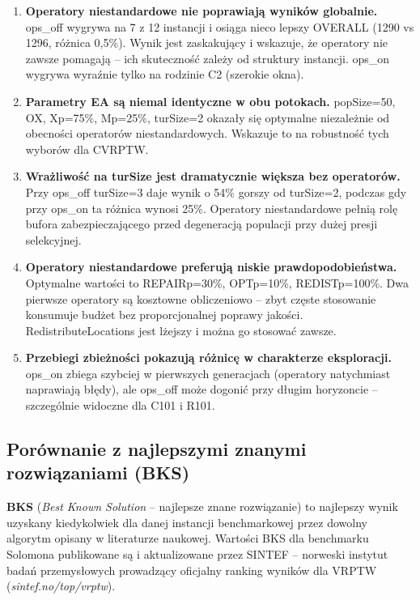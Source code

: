 \documentclass[11pt,a4paper]{article}
\begin{document}
\begin{enumerate}
    \item \textbf{Operatory niestandardowe nie poprawiają wyników globalnie.}
          ops\_off wygrywa na 7 z 12 instancji i osiąga nieco lepszy OVERALL
          (1290 vs 1296, różnica 0{,}5\%). Wynik jest zaskakujący i wskazuje,
          że operatory nie zawsze pomagają -- ich skuteczność zależy od struktury
          instancji. ops\_on wygrywa wyraźnie tylko na rodzinie C2 (szerokie okna).
    \item \textbf{Parametry EA są niemal identyczne w obu potokach.}
          popSize=50, OX, Xp=75\%, Mp=25\%, turSize=2 okazały się optymalne
          niezależnie od obecności operatorów niestandardowych.
          Wskazuje to na robustność tych wyborów dla CVRPTW.
    \item \textbf{Wrażliwość na turSize jest dramatycznie większa bez operatorów.}
          Przy ops\_off turSize=3 daje wynik o 54\% gorszy od turSize=2,
          podczas gdy przy ops\_on ta różnica wynosi 25\%.
          Operatory niestandardowe pełnią rolę bufora zabezpieczającego
          przed degeneracją populacji przy dużej presji selekcyjnej.
    \item \textbf{Operatory niestandardowe preferują niskie prawdopodobieństwa.}
          Optymalne wartości to REPAIRp=30\%, OPTp=10\%, REDISTp=100\%.
          Dwa pierwsze operatory są kosztowne obliczeniowo -- zbyt częste
          stosowanie konsumuje budżet bez proporcjonalnej poprawy jakości.
          RedistributeLocations jest lżejszy i można go stosować zawsze.
    \item \textbf{Przebiegi zbieżności pokazują różnicę w charakterze eksploracji.}
          ops\_on zbiega szybciej w pierwszych generacjach (operatory natychmiast
          naprawiają błędy), ale ops\_off może dogonić przy długim horyzoncie --
          szczególnie widoczne dla C101 i R101.
\end{enumerate}

\subsection{Porównanie z najlepszymi znanymi rozwiązaniami (BKS)}

\textbf{BKS} (\textit{Best Known Solution} -- najlepsze znane rozwiązanie) to
najlepszy wynik uzyskany kiedykolwiek dla danej instancji benchmarkowej przez
dowolny algorytm opisany w literaturze naukowej. Wartości BKS dla benchmarku
Solomona publikowane są i aktualizowane przez SINTEF -- norweski instytut badań
przemysłowych prowadzący oficjalny ranking wyników dla VRPTW
(\textit{sintef.no/top/vrptw}).
\end{document}
